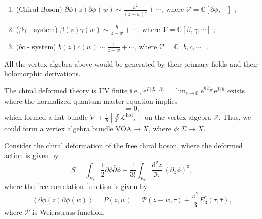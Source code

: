 \documentclass[10pt]{article}
\begin{document}
\begin{example}
  \begin{enumerate}[(1)]
    \item (Chiral Boson) $\partial \phi(z) \partial \phi(w) \sim \frac{\hbar^{2}}{(z-w)^{2}} + \cdots $, where $ \mathcal{V} = \mathbb{C}[\partial \phi, \cdots ]$ ;
    \item ($ \beta \gamma$ - system) $\beta(z) \gamma(w) \sim \frac{\hbar}{z-w} + \cdots $, where $ \mathcal{V} = \mathbb{C}[\beta, \gamma,\cdots ]$ ;
    \item ($ bc$ - system) $b(z) c(w) \sim \frac{1}{z-w} + \cdots $, where $ \mathcal{V} = \mathbb{C}[b, c, \cdots ]$.
  \end{enumerate}
  All the vertex algebra above would be generated by their primary fields and their holomorphic derivations.
\end{example}

The chiral deformed theory is UV finite i.e., $ \mathrm{e}^{I[L] / \hbar} = \lim _{\epsilon \rightarrow 0} \mathrm{e}^{\hbar \partial_{P^{L}_{\epsilon}}} \mathrm{e}^{I / \hbar}$ exists, where the normalized quantum master equation implies
\begin{equation*}
  [\oint \mathcal{L}^{\mathrm{hol}}, \oint \mathcal{L}^{\mathrm{hol}}] = 0,
\end{equation*}
which formed a flat bundle $ \nabla +\frac{1}{\hbar} [\oint \mathcal{L}^{\mathrm{hol}}, ~]$ on the vertex algebra $ \mathcal{V}$.
Thus, we could form a vertex algebra bundle $ \mathrm{VOA} \rightarrow X$, where $ \phi: \Sigma \rightarrow X$.
\begin{example}
  Consider the chiral deformation of the free chiral boson, where the deformed action is given by
  \begin{equation*}
    S = \int _{E_{\tau}} \frac{1}{2} \partial \phi \bar{\partial} \phi + \frac{1}{3!} \int _{E_{\tau}} \frac{\mathrm{d} ^{2} z}{\Im \tau} \, \left( \partial_{z} \phi \right)^{3},
  \end{equation*}
  where the free correlation function is given by
  \begin{equation*}
    \left< \partial \phi(z) \partial \phi(w) \right> = P(z, w) = \mathcal{P}(z-w, \tau) + \frac{\pi^2}{3} E^{*}_{3} (\tau, \bar{\tau}),
  \end{equation*}
  where $ \mathcal{P}$ is Weierstrass function.
\end{example}

\label{LastPage}
\end{document}
